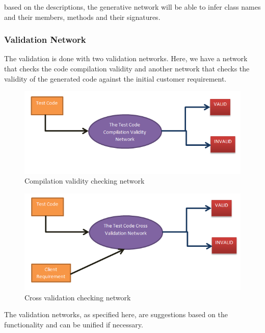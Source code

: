 \documentclass[conference]{IEEEtran}
\begin{document}
based on the descriptions, the generative network will be able to infer class names and their members, methods and their signatures.

\subsubsection{Validation Network}
The validation is done with two validation networks. Here, we have a network that checks the code compilation validity and another network that checks the validity of the generated code against the initial customer requirement.

\begin{figure}
	\includegraphics[width=\linewidth]{Compilation_validity.png}
	\caption{Compilation validity checking network}
	\label{fig4}
\end{figure}

\begin{figure}
	\includegraphics[width=\linewidth]{Cross_validation.png}
	\caption{Cross validation checking network}
	\label{fig5}
\end{figure}

The validation networks, as specified here, are suggestions based on the functionality and can be unified if necessary.
\end{document}
